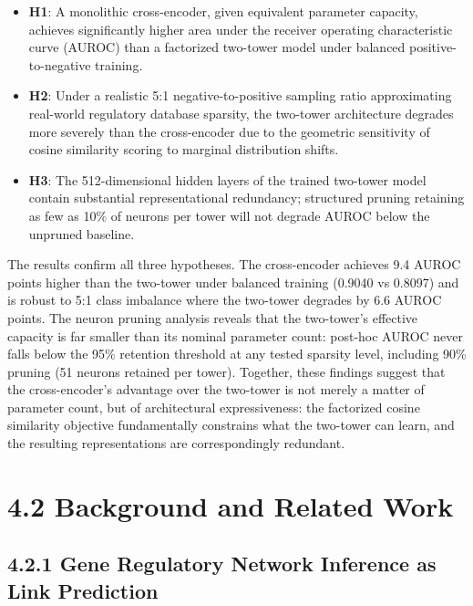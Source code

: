 \documentclass[
  12pt,
]{report}
\providecommand{\tightlist}{%
  \setlength{\itemsep}{0pt}\setlength{\parskip}{0pt}}
\begin{document}
\begin{itemize}
\tightlist
\item
  \textbf{H1}: A monolithic cross-encoder, given equivalent parameter
  capacity, achieves significantly higher area under the receiver
  operating characteristic curve (AUROC) than a factorized two-tower
  model under balanced positive-to-negative training.
\item
  \textbf{H2}: Under a realistic 5:1 negative-to-positive sampling ratio
  approximating real-world regulatory database sparsity, the two-tower
  architecture degrades more severely than the cross-encoder due to the
  geometric sensitivity of cosine similarity scoring to marginal
  distribution shifts.
\item
  \textbf{H3}: The 512-dimensional hidden layers of the trained
  two-tower model contain substantial representational redundancy;
  structured pruning retaining as few as 10\% of neurons per tower will
  not degrade AUROC below the unpruned baseline.
\end{itemize}

The results confirm all three hypotheses. The cross-encoder achieves 9.4
AUROC points higher than the two-tower under balanced training (0.9040
vs 0.8097) and is robust to 5:1 class imbalance where the two-tower
degrades by 6.6 AUROC points. The neuron pruning analysis reveals that
the two-tower's effective capacity is far smaller than its nominal
parameter count: post-hoc AUROC never falls below the 95\% retention
threshold at any tested sparsity level, including 90\% pruning (51
neurons retained per tower). Together, these findings suggest that the
cross-encoder's advantage over the two-tower is not merely a matter of
parameter count, but of architectural expressiveness: the factorized
cosine similarity objective fundamentally constrains what the two-tower
can learn, and the resulting representations are correspondingly
redundant.

\section{4.2 Background and Related
Work}\label{background-and-related-work}

\subsection{4.2.1 Gene Regulatory Network Inference as Link
Prediction}\label{gene-regulatory-network-inference-as-link-prediction}
\end{document}

